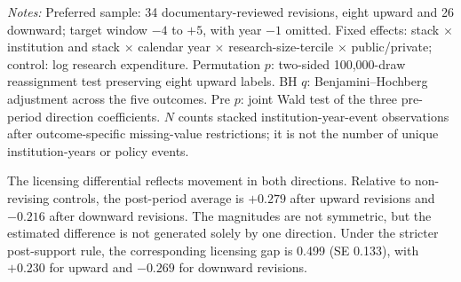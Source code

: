 \begin{table}[htbp]\centering
\caption{Technology-transfer outcomes around IP-policy revisions}\label{tab:main}
\begin{threeparttable}\footnotesize
{}
\begin{tablenotes}[flushleft]\footnotesize
\item \textit{Notes:} Preferred sample: 34 documentary-reviewed revisions, eight upward and 26 downward; target window $-4$ to $+5$, with year $-1$ omitted. Fixed effects: stack $\times$ institution and stack $\times$ calendar year $\times$ research-size-tercile $\times$ public/private; control: log research expenditure. Permutation $p$: two-sided 100,000-draw reassignment test preserving eight upward labels. BH $q$: Benjamini--Hochberg adjustment across the five outcomes. Pre $p$: joint Wald test of the three pre-period direction coefficients. $N$ counts stacked institution-year-event observations after outcome-specific missing-value restrictions; it is not the number of unique institution-years or policy events.
\end{tablenotes}
\end{threeparttable}
\end{table}

The licensing differential reflects movement in both directions. Relative to non-revising controls, the post-period average is $+0.279$ after upward revisions and $-0.216$ after downward revisions. The magnitudes are not symmetric, but the estimated difference is not generated solely by one direction. Under the stricter post-support rule, the corresponding licensing gap is 0.499 (SE 0.133), with $+0.230$ for upward and $-0.269$ for downward revisions.

